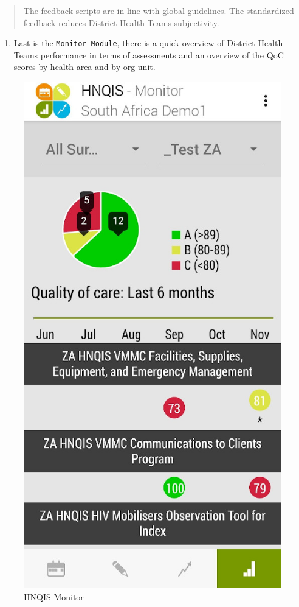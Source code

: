\documentclass[]{book}
\providecommand{\tightlist}{%
  \setlength{\itemsep}{0pt}\setlength{\parskip}{0pt}}
\begin{document}
\begin{quote}
The feedback scripts are in line with global guidelines. The standardized feedback reduces District Health Teams subjectivity.
\end{quote}

\begin{enumerate}
\def\labelenumi{\arabic{enumi}.}
\setcounter{enumi}{5}
\tightlist
\item
  Last is the \texttt{Monitor\ Module}, there is a quick overview of District Health Teams performance in terms of assessments and an overview of the QoC scores by health area and by org unit.
\end{enumerate}

\begin{figure}
\centering
\includegraphics{images/hnqis-monitor.jpg}
\caption{HNQIS Monitor}
\end{figure}
\end{document}
